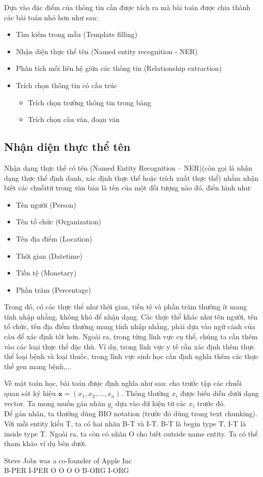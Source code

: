 \documentclass[14pt]{extreport}
\begin{document}
Dựa vào đặc điểm của thông tin cần được tách ra mà bài toán được chia thành các bài toán nhỏ hơn như sau:
\begin{itemize}
    \item Tìm kiếm trong mẫu (Template filling)
    \item Nhận diện thực thể tên (Named entity recognition - NER)
    \item Phân tích mối liên hệ giữa các thông tin (Relationship extraction)
    \item Trích chọn thông tin có cấu trúc
    \begin{itemize}
        \item Trích chọn trường thông tin trong bảng
        \item Trích chọn câu văn, đoạn văn
    \end{itemize}
\end{itemize}

\subsection{Nhận diện thực thể tên}
Nhận dạng thực thể có tên (Named Entity Recognition – NER)(còn gọi là nhận dạng thực thể định danh, xác định thực thể hoặc trích xuất thực thể) nhằm nhận biết các chuỗitừ trong văn bản là tên của một đối tượng nào đó, điển hình như:  

\begin{itemize}
    \item Tên người (Person) 
    \item Tên tổ chức (Organization)
    \item Tên địa điểm (Location) 
    \item Thời gian (Datetime) 
    \item Tiền tệ (Monetary)
    \item Phần trăm (Percentage) 
\end{itemize}

Trong đó, có các thực thể như thời gian, tiền tệ và phần trăm thường ít mang tính nhập nhằng, không khó để nhận dạng. Các thực thể khác như tên người, tên tổ chức, tên địa điểm thường mang tính nhập nhằng, phải dựa vào ngữ cảnh của câu để xác định tốt hơn. Ngoài ra, trong từng lĩnh vực cụ thể, chúng ta cần thêm vào các loại thực thể đặc thù. Ví dụ, trong lĩnh vực y tế cần xác định thêm thực thể loại bệnh và loại thuốc, trong lĩnh vực sinh học cần định nghĩa thêm các thực thể gen mang bệnh,...

Về mặt toán học, bài toán được định nghĩa như sau: cho trước tập các chuỗi quan sát ký hiệu $\textbf{x} = (x_1, x_2, ...,x_n)$. Thông thường $x_i$ được biểu diễn dưới dạng vector. Ta mong muốn gán nhãn $y_i$ dựa vào dữ kiện từ các $x_i$ trước đó.\\
Để gán nhãn, ta thường dùng BIO notation (trước đó dùng trong text chunking). Với mỗi entity kiểu T, ta có hai nhãn B-T và I-T. B-T là begin type T, I-T là inside type T. Ngoài ra, ta còn có nhãn O cho biết outside name entity. Ta có thể tham khảo ví dụ bên dưới.
\begin{displayquote}
Steve Jobs was a co-founder of Apple Inc\\
B-PER I-PER O O O O B-ORG I-ORG
\end{displayquote}
\end{document}
